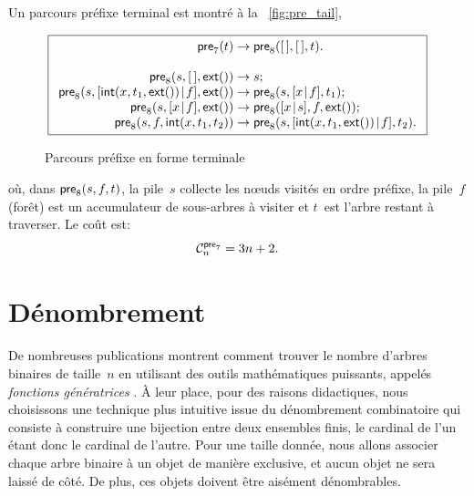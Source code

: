 Un parcours préfixe terminal est montré à la \fig~\vref{fig:pre_tail},
\begin{figure}[b]
\begin{equation*}
\boxed{
\begin{array}{r@{\;}c@{\;}l}
\fun{pre}_7(t) & \rightarrow & \fun{pre}_8(\el,\el,t).\\
\\
\fun{pre}_8(s,\el,\fun{ext}()) & \rightarrow & s;\\
\fun{pre}_8(s,\cons{\fun{int}(x,t_1,\fun{ext}())}{f},\fun{ext}()) &
\rightarrow & \fun{pre}_8(s,\cons{x}{f},t_1);\\
\fun{pre}_8(s,\cons{x}{f},\fun{ext}()) & \rightarrow &
\fun{pre}_8(\cons{x}{s},f,\fun{ext}());\\
\fun{pre}_8(s,f,\fun{int}(x,t_1,t_2)) & \rightarrow &
\fun{pre}_8(s,\cons{\fun{int}(x,t_1,\fun{ext}())}{f},t_2).
\end{array}}
\end{equation*}
\caption{Parcours préfixe en forme terminale}
\label{fig:pre_tail}
\end{figure}
où, dans \(\fun{pre}_8(s,f,t)\), la pile~\(s\) collecte les nœuds
visités en ordre préfixe, la pile~\(f\) (forêt) est un accumulateur de
sous-arbres à visiter et \(t\)~est l'arbre restant à traverser. Le
coût est:
\begin{equation*}
  \C{\fun{pre}_7}{n} = 3n + 2.
\end{equation*}

\section{Dénombrement}

De nombreuses publications \cite[\S~2.3.4.4]{Knuth_1997}
\cite[chap.~5]{SedgewickFlajolet_1996} montrent comment trouver le
nombre d'arbres binaires de taille~\(n\) en utilisant des outils
mathématiques puissants, appelés \emph{fonctions génératrices}
\cite[chap.~7]{GrahamKnuthPatashnik_1994}. À leur place, pour des
raisons didactiques, nous choisissons une technique plus intuitive
issue du dénombrement combinatoire
qui consiste à construire une bijection entre deux ensembles finis, le
cardinal de l'un étant donc le cardinal de l'autre. Pour une taille
donnée, nous allons associer chaque arbre binaire à un objet de
manière exclusive, et aucun objet ne sera laissé de côté. De plus, ces
objets doivent être aisément dénombrables.

